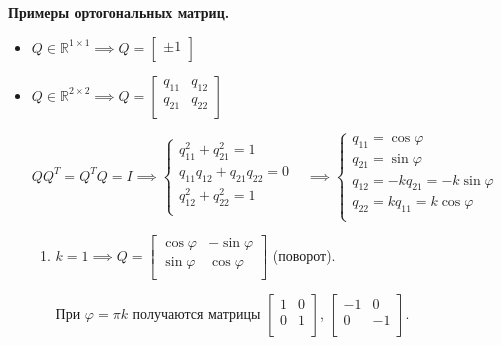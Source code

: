 \textbf{Примеры ортогональных матриц.}
\begin{itemize}
    \item $Q \in \mathbb{R}^{1\times1} \implies Q = \begin{bmatrix} \pm1\\ \end{bmatrix}$
    
    \item $Q \in \mathbb{R}^{2\times2} \implies 
    Q = \begin{bmatrix} 
        q_{11} & q_{12} \\
        q_{21} & q_{22} \\
    \end{bmatrix}$
    
    $QQ^T=Q^TQ=I \implies 
    \begin{cases}
    q_{11}^2 + q_{21}^2 = 1&\\
    q_{11}q_{12} + q_{21}q_{22} = 0&\\
    q_{12}^2 + q_{22}^2 = 1&\\
    \end{cases}
    \implies 
    \begin{cases}
    q_{11} = \cos\varphi&\\
    q_{21} = \sin\varphi&\\
    q_{12} = -kq_{21} = -k\sin\varphi&\\
    q_{22} = kq_{11} = k\cos\varphi&\\
    \end{cases}$
    
    \begin{enumerate}
        \item $k=1 \implies 
            Q = \begin{bmatrix} 
                \cos\varphi & -\sin\varphi \\
                \sin\varphi & \cos\varphi \\
            \end{bmatrix}$ (поворот).
            
        При $\varphi = \pi k$ получаются матрицы 
            $\begin{bmatrix} 
                1 & 0 \\
                0 & 1 \\
            \end{bmatrix}$, 
            $\begin{bmatrix} 
                -1 & 0 \\
                 0 & -1 \\
            \end{bmatrix}$.
            

\end{enumerate}
\end{itemize}
